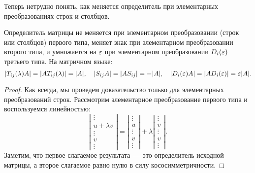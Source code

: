 Теперь нетрудно понять, как меняется определитель при элементарных
преобразованиях строк и столбцов.
\begin{theorem}\label{thm_det_under_elementary}
Определитель матрицы не меняется при элементарном преобразовании
(строк или столбцов) первого типа, меняет знак при элементарном
преобразовании второго типа, и умножается на $\varepsilon$ при элементарном
преобразовании $D_i(\varepsilon)$ третьего типа. На матричном языке:
$$
|T_{ij}(\lambda)A|=|AT_{ij}(\lambda)|=|A|,\quad
|S_{ij}A|=|AS_{ij}|=-|A|,\quad
|D_i(\varepsilon)A|=|AD_i(\varepsilon)|=\varepsilon|A|.
$$
\end{theorem}
\begin{proof}
Как всегда, мы проведем доказательство только для элементарных
преобразований строк. Рассмотрим элементарное преобразование первого
типа и воспользуемся линейностью:
$$
\left|\begin{matrix}\vdots \\ u+\lambda v \\ \vdots \\ v \\
    \vdots\end{matrix}\right|=
\left|\begin{matrix}\vdots \\ u \\ \vdots \\ v \\
    \vdots\end{matrix}\right|+
\lambda\left|\begin{matrix}\vdots \\ v \\ \vdots \\ v \\
    \vdots\end{matrix}\right|.
$$
Заметим, что первое слагаемое результата~--- это определитель исходной
матрицы, а второе слагаемое равно нулю в силу кососимметричности.


\end{proof}
